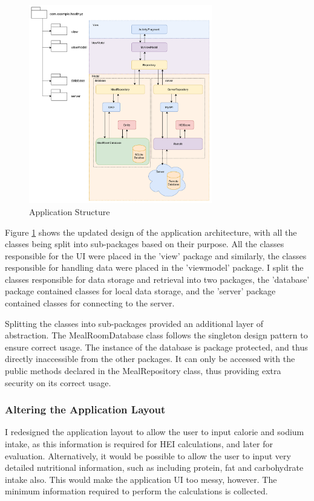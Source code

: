 \documentclass{article}
\begin{document}
\begin{figure}[h]
\centering
\includegraphics[width=8cm]{MVVM Structure.png}
\caption{Application Structure}
\label{fig:application_structure}
\end{figure}

\bigskip
\noindent Figure \ref{fig:application_structure} shows the updated design of the application architecture, with all the classes being split into sub-packages based on their purpose. All the classes responsible for the UI were placed in the 'view' package and similarly, the classes responsible for handling data were placed in the 'viewmodel' package. I split the classes responsible for data storage and retrieval into two packages, the 'database' package contained classes for local data storage, and the 'server' package contained classes for connecting to the server. 

\bigskip
\noindent Splitting the classes into sub-packages provided an additional layer of abstraction. The MealRoomDatabase class follows the singleton design pattern to ensure correct usage. The instance of the database is package protected, and thus directly inaccessible from the other packages. It can only be accessed with the public methods declared in the MealRepository class, thus providing extra security on its correct usage. 

\subsubsection{Altering the Application Layout}
I redesigned the application layout to allow the user to input calorie and sodium intake, as this information is required for HEI calculations, and later for evaluation. Alternatively, it would be possible to allow the user to input very detailed nutritional information, such as including protein, fat and carbohydrate intake also. This would make the application UI too messy, however. The minimum information required to perform the calculations is collected.
\end{document}
